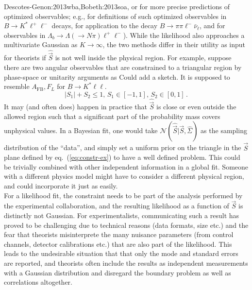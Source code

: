 \documentclass[aps,prd,reprint,nofootinbib,preprintnumbers]{revtex4}
\newcommand{\refeq}[1]{eq.~(\ref{eq:#1})}
\newcommand{\vecest}[1]{\widehat{\vec{#1}}}
\newcommand{\fred}[1]{{\color{brown!85!black}#1}}
\begin{document}
\begin{enumerate}
{    Descotes-Genon:2013wba,Bobeth:2013soa},
  or for more precise predictions of optimized observables; e.g.,
  \cite{Egede:2008uy,Egede:2010zc,Bobeth:2010wg,Becirevic:2011bp,
    Bobeth:2012vn,Matias:2012xw,DescotesGenon:2012zf} for definitions
  of such optimized observables in $B\to K^*\ell^+\ell^-$ decays,
  \cite{Faller:2013dwa} for application to the decay $B\to
  \pi\pi\ell^-\bar\nu_\ell$, and \cite{Boeer:2014xx} for observables
  in $\Lambda_b\to\Lambda(\to N\pi)\ell^+\ell^-$). While the
  likelihood also approaches a multivariate Gaussian as $K \to
  \infty$, the two methods differ in their utility as input for
  theorists if $\widehat{\vec{S}}$ is not well
  inside the physical region. For example, suppose there are two
  angular observables that are constrained to a triangular region by
  phase-space or unitarity arguments as \fred{Could add a sketch. It
    is supposed to resemble $A_{\text{FB}},F_L$ for $B \to K^* \ell
    \ell$.}
  \begin{equation}
    \label{eq:constr-ex}
    |S_1| + S_2 \le 1, \, S_1 \in [-1,1],\, S_2 \in [0,1] \,.
  \end{equation}
  It may (and often does) happen in practice that $\widehat{\vec{S}}$
  is close or even outside the allowed region such that a significant
  part of the probability mass covers unphysical values. In a Bayesian
  fit, one would take $\mathcal{N}(\vecest{S} | \vec{S},
  \widehat{\Sigma})$ as the sampling distribution of the ``data'', and
  simply set a uniform prior on the triangle in the $\vec{S}$ plane
  defined by \refeq{constr-ex} to have a well defined problem. This
  could be trivially combined with other independent information in a
  global fit. Someone with a different physics model might have to
  consider a
  different physical region, and could incorporate it just as easily.\\

  For a likelihood fit, the constraint needs to be part of the
  analysis performed by the experimental collaboration, and the
  resulting likelihood as a function of $\vec{S}$ is distinctly not
  Gaussian.  For experimentalists, communicating such a result has
  proved to be challenging due to technical reasons (data formats,
  size etc.) and the fear that theorists misinterprete the many
  nuisance parameters (from control channels, detector calibrations
  etc.) that are also part of the likelihood. This leads to the
  undesirable situation that that only the mode and standard errors
  are reported, and theorists often include the results as independent
  measurements with a Gaussian distribution and disregard the boundary
  problem as well as correlations altogether.

\end{enumerate}
\end{document}
